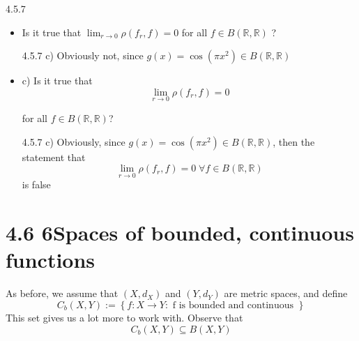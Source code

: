 \documentclass[a4paper,norsk]{article}
\renewcommand{\geq}{\geqslant}
\renewcommand{\epsilon}{\varepsilon}
\begin{document}
\begin{oppgavebox}{4.5.7}{}
\begin{itemize}
\begin{proofbox}{4.5.7 b)}{}
    We then get that 
    \[
        \left| x_n - y_n \right| \to 0
    \]
    as $ n \to \infty $. But $ \left| g(x_n) - g(y_n) \right| = \left| \cos( \pi \left( n+1 \right) )  - \cos( \pi n)    \right| = \left| \left( -1 \right) ^n - \left( -1 \right) ^{n+1} \right| = 2    $. So if we pick $ \epsilon = 1 $, then we can get that for large enough N, then for all $ n \geq N , \left| x_n - y_n \right| < \delta $, but $ \left| g(x_n) - g(y_n) \right| > \epsilon  = 1 $. Hence g is not uniformly continuous.
  \end{proofbox}
  \item Is it true that $ \lim_{r \to 0} \rho \left( f_r,f  \right) = 0   $ for all $ f \in B \left( \mathbb{R}, \mathbb{R} \right)  $ ?
  \begin{proofbox}{4.5.7 c)}{}
    Obviously not, since $ g(x) = \cos( \pi x^2) \in B \left( \mathbb{R}, \mathbb{R} \right)    $
  \end{proofbox} 


  \item c) Is it true that 
  \[
      \lim_{r \to 0} \rho \left( f_r, f \right) = 0  
  \]

  for all $ f \in  B \left( \mathbb{R}, \mathbb{R} \right)  $?

  \begin{proofbox}{4.5.7 c)}{}
    Obviously, since $ g(x) = \cos(\pi  x^2) \in  B \left( \mathbb{R}, \mathbb{R} \right)    $, then the statement that 
    \[
        \lim_{r \to 0} \rho \left( f_r, f \right) = 0 \;  \forall f \in  B \left( \mathbb{R}, \mathbb{R} \right) 
    \]
    is false
    
  \end{proofbox}
  
\end{itemize}
\end{oppgavebox}


\section*{4.6 6Spaces of bounded, continuous functions}

As before, we assume that $ \left( X, d_X \right)  $ and $ \left( Y, d_Y \right)  $   are metric spaces, and define 
\[
    C_b \left( X, Y \right) := \left\{ f: X \to Y : \text{ f is bounded and continuous } \right\} 
\]
This set gives us a lot more to work with. Observe that
\[
    C_b \left( X, Y  \right) \subseteq B \left( X, Y \right) 
\]
\end{document}
